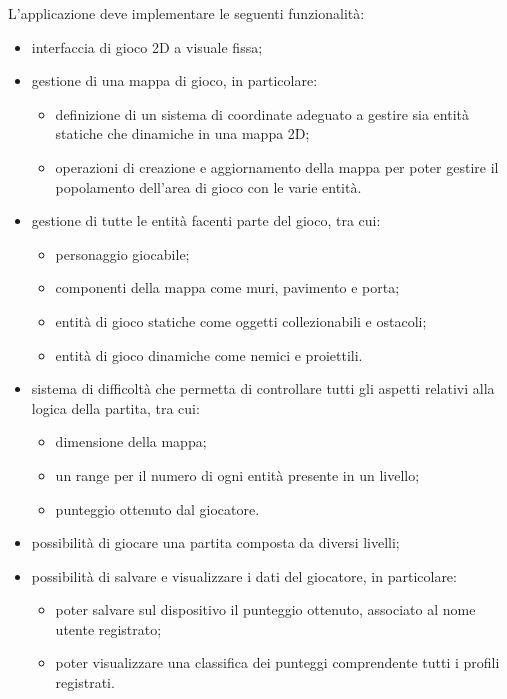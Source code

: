 L'applicazione deve implementare le seguenti funzionalità:
\begin{itemize}
	\item interfaccia di gioco 2D a visuale fissa;
	\item gestione di una mappa di gioco, in particolare:
	\begin{itemize}
	    \item definizione di un sistema di coordinate adeguato a gestire sia entità statiche che dinamiche in una mappa 2D;
	    \item operazioni di creazione e aggiornamento della mappa per poter gestire il popolamento dell'area di gioco con le varie entità.
	\end{itemize}
	\item gestione di tutte le entità facenti parte del gioco, tra cui:
	\begin{itemize}
	    \item personaggio giocabile;
	    \item componenti della mappa come muri, pavimento e porta;
	    \item entità di gioco statiche come oggetti collezionabili e ostacoli;
	    \item entità di gioco dinamiche come nemici e proiettili.
	\end{itemize}
	\item sistema di difficoltà che permetta di controllare tutti gli aspetti relativi alla logica della partita, tra cui:
	\begin{itemize}
	    \item dimensione della mappa;
	    \item un range per il numero di ogni entità presente in un livello;
	    \item punteggio ottenuto dal giocatore.
	\end{itemize}
	\item possibilità di giocare una partita composta da diversi livelli;
	\item possibilità di salvare e visualizzare i dati del giocatore, in particolare:
	\begin{itemize}
	    \item poter salvare sul dispositivo il punteggio ottenuto, associato al nome utente registrato;
	    \item poter visualizzare una classifica dei punteggi comprendente tutti i profili registrati.
	\end{itemize}
\end{itemize}